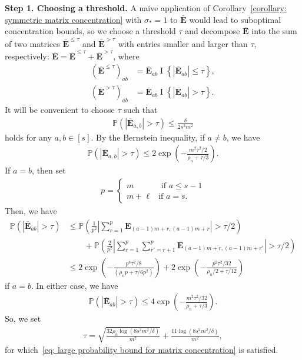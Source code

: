 \documentclass[11pt]{article}
\newcommand{\bE}{\bm{E}}
\newcommand{\bbP}{\mathbb{P}}
\newcommand{\indicator}[1]{{\operatorname{I} \left \{ #1\right \}}}
\newcommand{\<}{\langle}
\renewcommand{\>}{\rangle}
\newcommand{\avgMatrix}{\overline{\bm{E}}}
\newcommand{\avgLessT}{\overline{\bm{E}}^{\le\tau}}
\newcommand{\avgLarge}{\overline{\bm{E}}^{> \tau}}
\theoremstyle{plain}
\theoremstyle{definition}
\theoremstyle{remark}
\begin{document}
{\noindent \textbf{Step 1. Choosing a threshold.} A naive application of Corollary~\ref{corollary: symmetric matrix concentration} with $\sigma_* = 1$ to $\overline{\bE}$ would lead to suboptimal concentration bounds, so we choose a threshold $\tau$ and decompose $\overline{\bE}$ into the sum of two matrices $\avgLessT$ and $\avgLarge$ with entries smaller and larger than $\tau$, respectively: 
$\avgMatrix = \avgLessT+ \avgLarge$, where
\begin{align*}
    (\avgLessT)_{ab} & = \avgMatrix_{ab} \indicator{|\avgMatrix_{ab}| \le \tau}, \\
    (\avgLarge)_{ab} & = \avgMatrix_{ab} \indicator{|\avgMatrix_{ab}| > \tau}.
\end{align*}
It will be convenient to choose $\tau$ such that
\begin{align}
    \bbP \left ( |\avgMatrix_{a,b}| > \tau \right ) \le \frac{\delta}{2s^2 m^2} \label{eq: large probability bound for matrix concentration}
\end{align}
holds for any $a, b \in [s]$. 
By the Bernstein inequality, if $a \neq b$, we have
\begin{align*}
    \bbP \left ( |\avgMatrix_{a,b}| > \tau \right ) \le 2 \exp \left ( - \frac{m^2 \tau^2/2}{\rho_n+ \tau/3 } \right ).
\end{align*}
If $a = b$, then set
\begin{align*}
    p = \begin{cases}
        m & \text{ if } a \le s - 1 \\
        m + \ell & \text{if } a = s.
    \end{cases}
\end{align*}
Then, we have
\begin{align*}
     \bbP \left ( |\avgMatrix_{ab}| > \tau \right ) & \le \bbP \left ( \frac{1}{p^2} \left |\sum_{r = 1}^p \bE_{(a - 1) m + r, (a - 1)m + r} \right | > \tau/2  \right ) \\
     & \qquad + \bbP \left ( \frac{2}{p^2} \left |\sum_{r = 1}^p \sum_{r' = r + 1}^p \bE_{(a - 1) m + r, (a - 1)m + r'} \right | > \tau/2  \right ) \\
     & \le 2 \exp \left ( - \frac{p^4 \tau^2/8}{(\rho_n p + \tau/6p^2)} \right ) + 2 \exp \left (- \frac{p^2 \tau^2/32}{\rho_n /2  + \tau/12} \right )
\end{align*}
if $a = b$. In either case, we have
\begin{align*}
    \bbP \left ( |\overline{\bE}_{ab}| > \tau \right ) \le 4 \exp \left ( - \frac{m^2 \tau^2/32}{\rho_n + \tau/3}\right ).
\end{align*}
So, we set
\begin{align*}
    \tau = \sqrt{\frac{32 \rho_n \log(8 s^2 m^2/\delta)}{m^2}} + \frac{11 \log(8 s^2 m^2/\delta)}{m^2},
\end{align*}
for which~\eqref{eq: large probability bound for matrix concentration} is satisfied.

}
\end{document}
